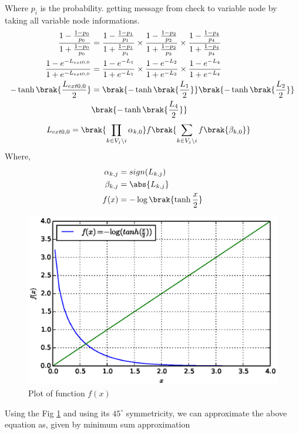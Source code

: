\documentclass[journal,12pt,twocolumn]{IEEEtran}
\begin{document}
\begin{enumerate}
Where $p_i$ is the probability. getting message from check to variable node by taking all variable node informations.
\begin{align}
\frac{1-\frac{1-p_0}{p_0}}{1+\frac{1-p_0}{p_0}} & = \frac{1-\frac{1-p_1}{p_1}}{1+\frac{1-p_1}{p_1}} \times \frac{1-\frac{1-p_2}{p_2}}{1+\frac{1-p_2}{p_2}} \times \frac{1-\frac{1-p_4}{p_4}}{1+\frac{1-p_4}{p_4}}\\
\frac{1-e^{-L_{ext0,0}}}{1+e^{-L_{ext0,0}}} &=\frac{1-e^{-L_{1}}}{1+e^{-L_{1}}}\times \frac{1-e^{-L_{2}}}{1+e^{-L_{2}}} \times \frac{1-e^{-L_{4}}}{1+e^{-L_{4}}}\\ \nonumber
-\tanh \brak{\frac{L_{ext0,0}}{2}}& =\brak{-\tanh \brak{\frac{L_{1}}{2}}}\brak{-\tanh \brak{\frac{L_{2}}{2}}}\\
&\brak{ -\tanh \brak{\frac{L_{4}}{2}} }
\end{align}
\begin{align}
L_{ext0,0}&=\brak{\prod_{k \in V_j \setminus i}\alpha_{k,0}} f\brak{\sum_{k \in V_j \setminus i}f\brak{\beta_{k,0}}} \label{eq:main}
\end{align}
Where,
\begin{align}
\alpha_{k,j}&=sign(L_{k,j})\\
\beta_{k,j}&=\abs{L_{k,j}}\\
f(x)&= - \log \brak{\tanh{\frac{x}{2}}}
\end{align}
 \begin{figure}[!ht]
\begin{center}
\includegraphics[width=\columnwidth]{./figs/fxgraph}
\caption{Plot of function $f(x)$}
\label{fig : fx}
\end{center}
\end{figure}
Using the Fig \ref{fig : fx} and using its $45^\circ$ symmetricity, we can approximate the above equation as, given by minimum sum approximation \cite{minsum} 

\end{enumerate}
\end{document}
